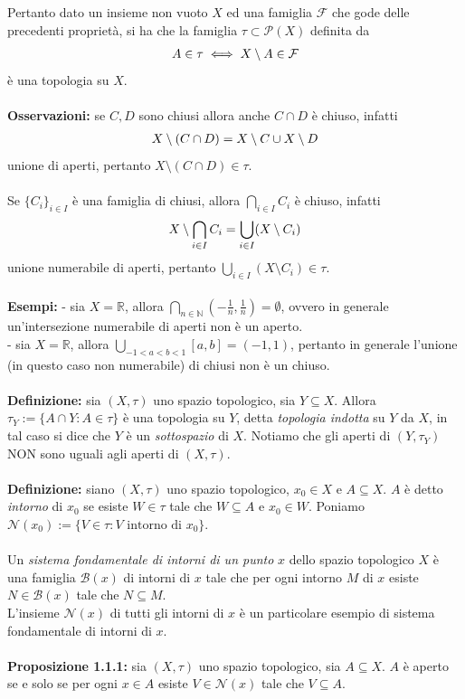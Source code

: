 \documentclass{article}
\begin{document}
Pertanto dato un insieme non vuoto $X$ ed una famiglia $\mathcal{F}$ che gode delle precedenti proprietà, si ha che la famiglia $\tau \subset \mathcal{P}(X)$ definita da
\begin{gather}
    A \in \tau \iff X \setminus A \in \mathcal{F} \notag
\end{gather}
è una topologia su $X$. \\ \\
\textbf{Osservazioni:} se $C, D$ sono chiusi allora anche $C \cap D$ è chiuso, infatti
\begin{gather}
    X \setminus (C \cap D) = X \setminus C \cup X \setminus D \notag
\end{gather}
unione di aperti, pertanto $X \setminus (C \cap D) \in \tau$. \\ \\
Se $\{ C_i \}_{i \in I}$ è una famiglia di chiusi, allora $\bigcap_{i \in I} C_i$ è chiuso, infatti
\begin{gather}
    X \setminus \bigcap_{i \in I} C_i = \bigcup_{i \in I} (X \setminus C_i) \notag
\end{gather}
unione numerabile di aperti, pertanto $\bigcup_{i \in I} (X \setminus C_i) \in \tau$. \\ \\
\textbf{Esempi:} - sia $X = \mathbb{R}$, allora $\bigcap_{n \in \mathbb{N}} \left(-\frac{1}{n}, \frac{1}{n}\right) = \emptyset$, ovvero in generale un'intersezione numerabile di aperti non è un aperto. \\
- sia $X = \mathbb{R}$, allora $\bigcup_{-1 < a < b < 1} [a, b] = (-1, 1)$, pertanto in generale l'unione (in questo caso non numerabile) di chiusi non è un chiuso. \\ \\
\textbf{Definizione:} sia $(X, \tau)$ uno spazio topologico, sia $Y \subseteq X$. Allora $\tau_Y := \{ A \cap Y : A \in \tau \}$ è una topologia su $Y$, detta \textit{topologia indotta} su $Y$ da $X$, in tal caso si dice che $Y$ è un \textit{sottospazio} di $X$. Notiamo che gli aperti di $(Y, \tau_Y)$ NON sono uguali agli aperti di $(X, \tau)$. \\ \\
\textbf{Definizione:} siano $(X, \tau)$ uno spazio topologico, $x_0 \in X$ e $A \subseteq X$. $A$ è detto \textit{intorno} di $x_0$ se esiste $W \in \tau$ tale che $W \subseteq A$ e $x_0 \in W$. Poniamo $\mathcal{N}(x_0) := \{ V \in \tau : V \text{ intorno di } x_0 \}$. \\ \\
Un \textit{sistema fondamentale di intorni di un punto} $x$ dello spazio topologico $X$ è una famiglia $\mathcal{B}(x)$ di intorni di $x$ tale che per ogni intorno $M$ di $x$ esiste $N \in \mathcal{B}(x)$ tale che $N \subseteq M$. \\
L'insieme $\mathcal{N}(x)$ di tutti gli intorni di $x$ è un particolare esempio di sistema fondamentale di intorni di $x$. \\ \\
\textbf{Proposizione 1.1.1:} sia $(X, \tau)$ uno spazio topologico, sia $A \subseteq X$. $A$ è aperto se e solo se per ogni $x \in A$ esiste $V \in \mathcal{N}(x)$ tale che $V \subseteq A$. \\
\end{document}
